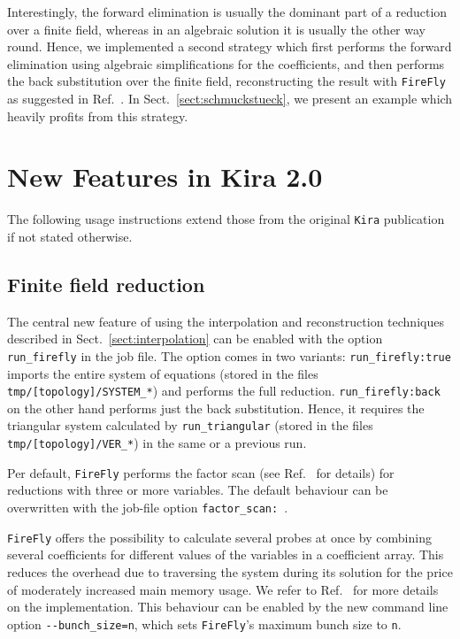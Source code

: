 \documentclass[11pt,a4paper,DIV=11,numbers=noenddot,parskip=half]{scrartcl}
\newcommand{\code}[1]{\texttt{#1}}
\newcommand*{\kira}{\code{Kira}}
\newcommand*{\firefly}{\code{FireFly}}
\begin{document}
Interestingly, the forward elimination is usually the dominant part of a reduction over a finite field, whereas in an algebraic solution it is usually the other way round.
Hence, we implemented a second strategy which first performs the forward elimination using algebraic simplifications for the coefficients, and then performs the back substitution over the finite field, reconstructing the result with \firefly{} as suggested in Ref.~\cite{Klappert:2019emp}.
In Sect.~\ref{sect:schmuckstueck}, we present an example which heavily profits from this strategy.


\section{New Features in Kira 2.0}
\label{sect:features}

The following usage instructions extend those from the original \kira{} publication \cite{Maierhoefer:2017hyi} if not stated otherwise.


\subsection{Finite field reduction}
\label{sect:finite_field}

The central new feature of using the interpolation and reconstruction techniques described in Sect.~\ref{sect:interpolation} can be enabled with the option \code{run\_firefly} in the job file.
The option comes in two variants:
\code{run\_firefly:\;true} imports the entire system of equations (stored in the files \code{tmp/[topology]/SYSTEM\_*}) and performs the full reduction.
\code{run\_firefly:\;back} on the other hand performs just the back substitution.
Hence, it requires the triangular system calculated by \code{run\_triangular} (stored in the files \code{tmp/[topology]/VER\_*}) in the same or a previous run.

Per default, \firefly{} performs the factor scan (see Ref.~\cite{Klappert:2020aqs} for details) for reductions with three or more variables.
The default behaviour can be overwritten with the job-file option \code{factor\_scan:\ <true|false>}.

\firefly{} offers the possibility to calculate several probes at once by combining several coefficients for different values of the variables in a coefficient array.
This reduces the overhead due to traversing the system during its solution for the price of moderately increased main memory usage.
We refer to Ref.~\cite{Klappert:2020aqs} for more details on the implementation.
This behaviour can be enabled by the new command line option \code{-{}-bunch\_size=n}, which sets \firefly{}'s maximum bunch size to \code{n}.
\end{document}
